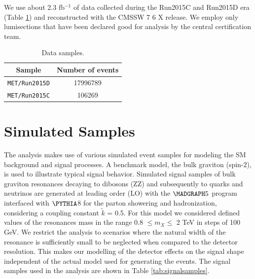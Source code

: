 We use about 2.3 fb$^{-1}$ of data collected during the Run2015C and Run2015D era (Table \ref{tab:datasamples}) and reconstructed with the CMSSW 7 6 X release. We employ only lumisections that have been declared good for analysis by the central certification team.

\begin{table}[!ht]
\begin{center}
\caption{Data samples.}
\label{tab:datasamples}
\begin{tabular}{cc} \hline
Sample & Number of events  \\ \hline
\verb|MET/Run2015D| & 17996789   \\
\verb|MET/Run2015C| & 106269  \\ \hline
\end{tabular}
\end{center}
\end{table}


\section{Simulated Samples}

The analysis makes use of various simulated event samples for modeling the SM background and signal processes. A benchmark model, the bulk graviton (spin-2), is used to illustrate typical signal behavior. Simulated signal samples of bulk graviton resonances decaying to dibosons (ZZ) and subsequently to quarks and neutrinos are generated at leading order (LO) with the $\MADGRAPH 5$ \cite{Alwall:2014hca}  program interfaced with $\PYTHIA$8 \cite{Sjostrand:2006za,Sjostrand:2007gs} for the parton showering and hadronization, considering a coupling constant $\tilde{k}$ = 0.5. For this model we considered defined values of the resonances mass in the range 0.8 $ \leq m_{X} \leq $ 2 TeV in steps of 100 GeV. We restrict the analysis to scenarios where the natural width of the resonance is sufficiently small to be neglected when compared to the detector resolution. This makes our modelling of the detector effects on the signal shape independent of the actual model used for generating the events. The signal samples used in the analysis are shown in Table \ref{tab:signalsamples}.

